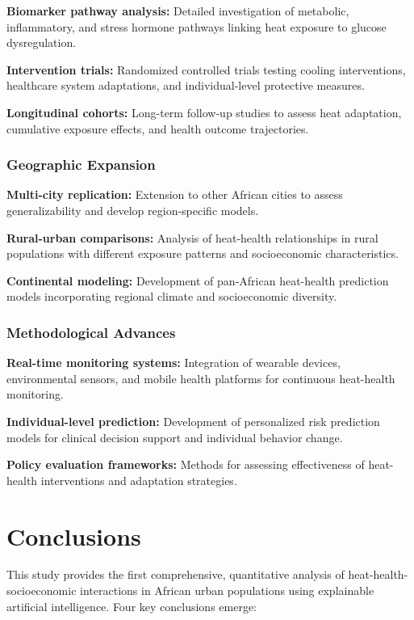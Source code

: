 \documentclass[11pt,a4paper]{article}
\begin{document}
\textbf{Biomarker pathway analysis:} Detailed investigation of metabolic, inflammatory, and stress hormone pathways linking heat exposure to glucose dysregulation.

\textbf{Intervention trials:} Randomized controlled trials testing cooling interventions, healthcare system adaptations, and individual-level protective measures.

\textbf{Longitudinal cohorts:} Long-term follow-up studies to assess heat adaptation, cumulative exposure effects, and health outcome trajectories.

\subsubsection{Geographic Expansion}

\textbf{Multi-city replication:} Extension to other African cities to assess generalizability and develop region-specific models.

\textbf{Rural-urban comparisons:} Analysis of heat-health relationships in rural populations with different exposure patterns and socioeconomic characteristics.

\textbf{Continental modeling:} Development of pan-African heat-health prediction models incorporating regional climate and socioeconomic diversity.

\subsubsection{Methodological Advances}

\textbf{Real-time monitoring systems:} Integration of wearable devices, environmental sensors, and mobile health platforms for continuous heat-health monitoring.

\textbf{Individual-level prediction:} Development of personalized risk prediction models for clinical decision support and individual behavior change.

\textbf{Policy evaluation frameworks:} Methods for assessing effectiveness of heat-health interventions and adaptation strategies.

\section{Conclusions}

This study provides the first comprehensive, quantitative analysis of heat-health-socioeconomic interactions in African urban populations using explainable artificial intelligence. Four key conclusions emerge:
\end{document}
